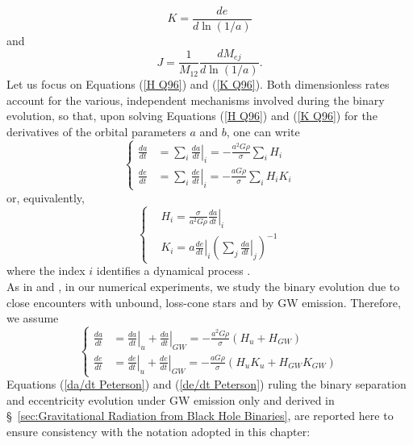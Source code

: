 \documentclass[12pt,twoside,openany]{book}
\begin{document}
\begin{equation}\label{K Q96}
    K=\frac{de}{d\ln({1/a})}
\end{equation}
and 
\begin{equation}\label{J Q96}
    J=\frac{1}{M_{12}}\frac{dM_{ej}}{d\ln({1/a})}.
\end{equation}
Let us focus on Equations (\ref{H Q96}) and (\ref{K Q96}). Both dimensionless rates account for the various, independent mechanisms involved during the binary evolution, so that, upon solving Equations (\ref{H Q96}) and (\ref{K Q96}) for the derivatives of the orbital parameters $a$ and $b$, one can write
\begin{equation}
\left\{
\begin{aligned}
\frac{da}{dt} &= \sum_i \left.\frac{da}{dt}\right|_i
= -\frac{a^2 G \rho}{\sigma}\sum_i H_i \\
\frac{de}{dt} &= \sum_i \left.\frac{de}{dt}\right|_i
= -\frac{a G \rho}{\sigma}\sum_i H_iK_i
\end{aligned}
\right.
\label{Sesana_2010 a and e derivatives}
\end{equation}
or, equivalently,
\begin{equation}
\left\{
\begin{aligned}
&H_i=\frac{\sigma}{a^2G\rho} \left.\frac{da}{dt}\right|_i\\
&K_i= a \left.\frac{de}{dt}\right|_i
\left(\sum_j\left.\frac{da}{dt}\right|_j\right)^{-1}
\end{aligned}
\right.
\label{Sesana_2010 H_i and K_i}
\end{equation}
where the index $i$ identifies a dynamical process \parencite{Sesana_2010}.\\As in \textcite{Quinlan_1996} and \textcite{Sesana_2006}, in our numerical experiments, we study the binary evolution due to close encounters with unbound, loss-cone stars and by GW emission. Therefore, we assume
\begin{equation}
\left\{
\begin{aligned}
\frac{da}{dt} &= \left.\frac{da}{dt}\right|_u+\left.\frac{da}{dt}\right|_{GW}
= -\frac{a^2 G \rho}{\sigma}( H_u + H_{GW}) \\
\frac{de}{dt} &= \left.\frac{de}{dt}\right|_u+\left.\frac{de}{dt}\right|_{GW}
= -\frac{a G \rho}{\sigma}( H_uK_u+H_{GW}K_{GW})
\end{aligned}
\right.
\label{Sesana_2010 a and e derivatives for u and GW}
\end{equation}
Equations (\ref{da/dt Peterson}) and (\ref{de/dt Peterson}) ruling the binary separation and eccentricity evolution under GW emission only and derived in \S~\ref{sec:Gravitational Radiation from Black Hole Binaries}, are reported here to ensure consistency with the notation adopted in this chapter:
\end{document}
